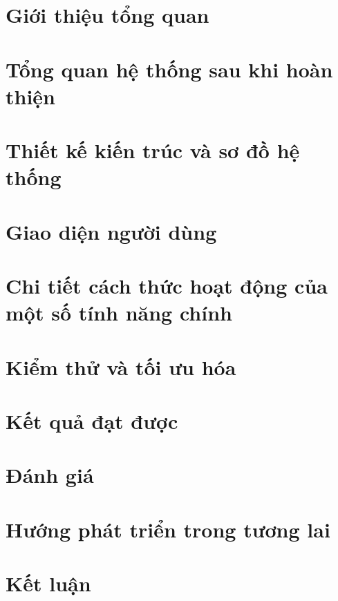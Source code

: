 \documentclass[12pt,a4paper]{report}
\theoremstyle{definition}
\begin{document}
\begin{singlespace}
	\listoffigures
\end{singlespace}
\newpage

\begin{singlespace}
	\listoftables
\end{singlespace}
\newpage
\chapter{Giới thiệu tổng quan}

\chapter{Tổng quan hệ thống sau khi hoàn thiện}

\chapter{Thiết kế kiến trúc và sơ đồ hệ thống}

\chapter{Giao diện người dùng}
% 
% 
\chapter{Chi tiết cách thức hoạt động của một số tính năng chính}

\chapter{Kiểm thử và tối ưu hóa}

\chapter{Kết quả đạt được}

\chapter{Đánh giá}

\chapter{Hướng phát triển trong tương lai}
\chapter{Kết luận}


% 
% 
% 
% 
% 
\end{document}
